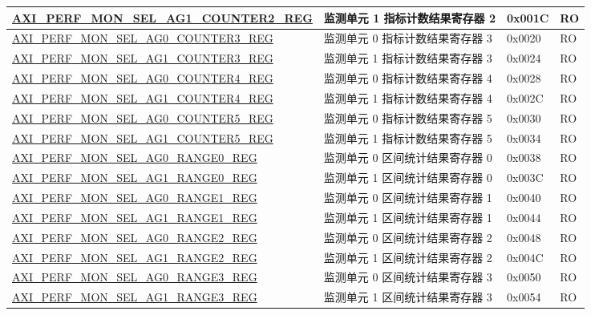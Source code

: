 \begin{longtable}{ | p{9.1cm} | p{5cm} | p{1.3cm} | p{1.3cm} | }
\hyperref[regdesc:AXIPERFMONSELAGNCOUNTERMREG]{AXI\_PERF\_MON\_SEL\_AG1\_COUNTER2\_REG} & 监测单元 1 指标计数结果寄存器 2 & 0x001C & RO\\ \hline
\hyperref[regdesc:AXIPERFMONSELAGNCOUNTERMREG]{AXI\_PERF\_MON\_SEL\_AG0\_COUNTER3\_REG} & 监测单元 0 指标计数结果寄存器 3 & 0x0020 & RO\\ \hline
\hyperref[regdesc:AXIPERFMONSELAGNCOUNTERMREG]{AXI\_PERF\_MON\_SEL\_AG1\_COUNTER3\_REG} & 监测单元 1 指标计数结果寄存器 3 & 0x0024 & RO\\ \hline
\hyperref[regdesc:AXIPERFMONSELAGNCOUNTERMREG]{AXI\_PERF\_MON\_SEL\_AG0\_COUNTER4\_REG} & 监测单元 0 指标计数结果寄存器 4 & 0x0028 & RO\\ \hline
\hyperref[regdesc:AXIPERFMONSELAGNCOUNTERMREG]{AXI\_PERF\_MON\_SEL\_AG1\_COUNTER4\_REG} & 监测单元 1 指标计数结果寄存器 4 & 0x002C & RO\\ \hline
\hyperref[regdesc:AXIPERFMONSELAGNCOUNTERMREG]{AXI\_PERF\_MON\_SEL\_AG0\_COUNTER5\_REG} & 监测单元 0 指标计数结果寄存器 5 & 0x0030 & RO\\ \hline
\hyperref[regdesc:AXIPERFMONSELAGNCOUNTERMREG]{AXI\_PERF\_MON\_SEL\_AG1\_COUNTER5\_REG} & 监测单元 1 指标计数结果寄存器 5 & 0x0034 & RO\\ \hline
\hyperref[regdesc:AXIPERFMONSELAGNRANGEMREG]{AXI\_PERF\_MON\_SEL\_AG0\_RANGE0\_REG} & 监测单元 0 区间统计结果寄存器 0 & 0x0038 & RO\\ \hline
\hyperref[regdesc:AXIPERFMONSELAGNRANGEMREG]{AXI\_PERF\_MON\_SEL\_AG1\_RANGE0\_REG} & 监测单元 1 区间统计结果寄存器 0 & 0x003C & RO\\ \hline
\hyperref[regdesc:AXIPERFMONSELAGNRANGEMREG]{AXI\_PERF\_MON\_SEL\_AG0\_RANGE1\_REG} & 监测单元 0 区间统计结果寄存器 1 & 0x0040 & RO\\ \hline
\hyperref[regdesc:AXIPERFMONSELAGNRANGEMREG]{AXI\_PERF\_MON\_SEL\_AG1\_RANGE1\_REG} & 监测单元 1 区间统计结果寄存器 1 & 0x0044 & RO\\ \hline
\hyperref[regdesc:AXIPERFMONSELAGNRANGEMREG]{AXI\_PERF\_MON\_SEL\_AG0\_RANGE2\_REG} & 监测单元 0 区间统计结果寄存器 2 & 0x0048 & RO\\ \hline
\hyperref[regdesc:AXIPERFMONSELAGNRANGEMREG]{AXI\_PERF\_MON\_SEL\_AG1\_RANGE2\_REG} & 监测单元 1 区间统计结果寄存器 2 & 0x004C & RO\\ \hline
\hyperref[regdesc:AXIPERFMONSELAGNRANGEMREG]{AXI\_PERF\_MON\_SEL\_AG0\_RANGE3\_REG} & 监测单元 0 区间统计结果寄存器 3 & 0x0050 & RO\\ \hline
\hyperref[regdesc:AXIPERFMONSELAGNRANGEMREG]{AXI\_PERF\_MON\_SEL\_AG1\_RANGE3\_REG} & 监测单元 1 区间统计结果寄存器 3 & 0x0054 & RO\\ \hline

\end{longtable}
